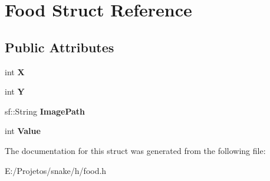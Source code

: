 \hypertarget{struct_food}{}\section{Food Struct Reference}
\label{struct_food}
\subsection*{Public Attributes}
\begin{DoxyCompactItemize}
\item 
\hypertarget{struct_food_a0875ef848eb47b092ff49179b66555ff}{}int {\bfseries X}\label{struct_food_a0875ef848eb47b092ff49179b66555ff}

\item 
\hypertarget{struct_food_a05e54695e32abc2b9b4c350dabead42e}{}int {\bfseries Y}\label{struct_food_a05e54695e32abc2b9b4c350dabead42e}

\item 
\hypertarget{struct_food_aecbe22e0ce4920b5cf60674dbf9e7b8e}{}sf\+::\+String {\bfseries Image\+Path}\label{struct_food_aecbe22e0ce4920b5cf60674dbf9e7b8e}

\item 
\hypertarget{struct_food_af39e588e019c0e56bda960a32845e971}{}int {\bfseries Value}\label{struct_food_af39e588e019c0e56bda960a32845e971}

\end{DoxyCompactItemize}


The documentation for this struct was generated from the following file\+:\begin{DoxyCompactItemize}
\item 
E\+:/\+Projetos/snake/h/food.\+h\end{DoxyCompactItemize}
